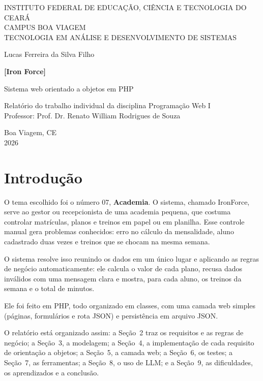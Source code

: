 \documentclass[12pt,a4paper]{article}
\newcommand{\nomesistema}{[Iron Force]}
\begin{document}
\begin{titlepage}
  \centering
  {\large INSTITUTO FEDERAL DE EDUCAÇÃO, CIÊNCIA E TECNOLOGIA DO CEARÁ\\
  CAMPUS BOA VIAGEM\\
  TECNOLOGIA EM ANÁLISE E DESENVOLVIMENTO DE SISTEMAS\par}
  \vspace{3cm}
  {\large Lucas Ferreira da Silva Filho\par}
  \vspace{3cm}
  {\Large\bfseries \nomesistema\par}
  \vspace{0.5cm}
  {\large Sistema web orientado a objetos em PHP\par}
  \vfill
  {\large Relatório do trabalho individual da disciplina Programação Web I\\
  Professor: Prof. Dr. Renato William Rodrigues de Souza\par}
  \vspace{2cm}
  {\large Boa Viagem, CE\\2026\par}
\end{titlepage}

\tableofcontents
\clearpage

\section{Introdução}

O tema escolhido foi o número 07, \textbf{Academia}. O sistema, chamado IronForce, serve ao gestor ou recepcionista de uma academia pequena, que costuma controlar matrículas, planos e treinos em papel ou em planilha. Esse controle manual gera problemas conhecidos: erro no cálculo da mensalidade, aluno cadastrado duas vezes e treinos que se chocam na mesma semana.

O sistema resolve isso reunindo os dados em um único lugar e aplicando as regras de negócio automaticamente: ele calcula o valor de cada plano, recusa dados inválidos com uma mensagem clara e mostra, para cada aluno, os treinos da semana e o total de minutos.

Ele foi feito em PHP, todo organizado em classes, com uma camada web simples (páginas, formulários e rota JSON) e persistência em arquivo JSON.

O relatório está organizado assim: a Seção~2 traz os requisitos e as regras de negócio; a Seção~3, a modelagem; a Seção~4, a implementação de cada requisito de orientação a objetos; a Seção~5, a camada web; a Seção~6, os testes; a Seção~7, as ferramentas; a Seção~8, o uso de LLM; e a Seção~9, as dificuldades, os aprendizados e a conclusão.
\end{document}

